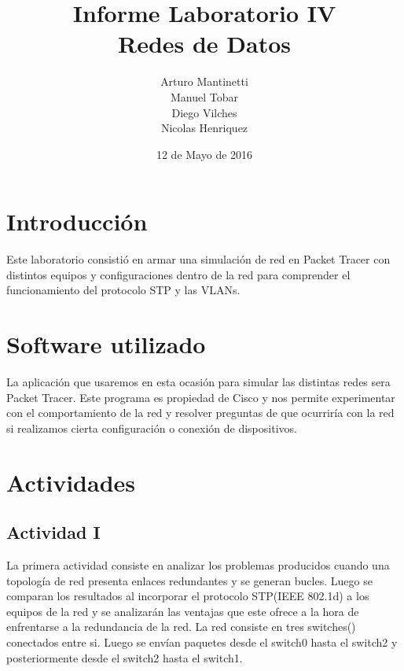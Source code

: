 \documentclass[spanish]{udpreport}
\title{Informe Laboratorio IV \\ Redes de Datos}
\author{Arturo Mantinetti \\ Manuel Tobar \\ Diego Vilches \\ Nicolas Henriquez}
\date{12 de Mayo de 2016}
\begin{document}
\maketitle

\tableofcontents

\chapter{Introducción}

Este laboratorio consistió en armar una simulación de red en Packet Tracer con distintos equipos y configuraciones dentro de la red para comprender el funcionamiento del protocolo STP y las VLANs.

\chapter{Software utilizado}
La aplicación que usaremos en esta ocasión para simular las distintas redes sera Packet Tracer. Este programa es propiedad de Cisco y nos permite experimentar con el comportamiento de la red y resolver preguntas de que ocurriría con la red si realizamos cierta configuración o conexión de dispositivos.

\chapter{Actividades}

\section{Actividad I}
La primera actividad consiste en analizar los problemas producidos cuando una topología de red presenta enlaces redundantes y se generan bucles. Luego se comparan los resultados al incorporar el protocolo STP(IEEE 802.1d) a los equipos de la red y se analizarán las ventajas que este ofrece a la hora de enfrentarse a la redundancia de la red.
La red consiste en tres switches()  conectados entre si. Luego se envían paquetes desde el switch0 hasta el switch2 y posteriormente desde el switch2 hasta el switch1.
\end{document}
